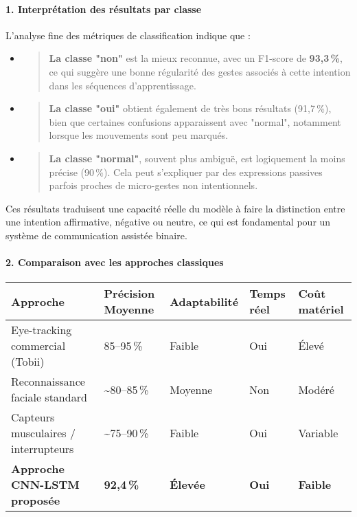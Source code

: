 \documentclass[
]{article}
\begin{document}
\hypertarget{interpruxe9tation-des-ruxe9sultats-par-classe}{%
\paragraph{\texorpdfstring{\textbf{1. Interprétation des résultats par classe}}{1. Interprétation des résultats par classe}}\label{interpruxe9tation-des-ruxe9sultats-par-classe}}

L'analyse fine des métriques de classification indique que :

\begin{itemize}
\item
  \begin{quote}
  \textbf{La classe "non"} est la mieux reconnue, avec un F1-score de \textbf{93,3\,\%}, ce qui suggère une bonne régularité des gestes associés à cette intention dans les séquences d'apprentissage.
  \end{quote}
\item
  \begin{quote}
  \textbf{La classe "oui"} obtient également de très bons résultats (91,7\,\%), bien que certaines confusions apparaissent avec "normal", notamment lorsque les mouvements sont peu marqués.
  \end{quote}
\item
  \begin{quote}
  \textbf{La classe "normal"}, souvent plus ambiguë, est logiquement la moins précise (90\,\%). Cela peut s'expliquer par des expressions passives parfois proches de micro-gestes non intentionnels.
  \end{quote}
\end{itemize}

Ces résultats traduisent une capacité réelle du modèle à faire la distinction entre une intention affirmative, négative ou neutre, ce qui est fondamental pour un système de communication assistée binaire.

\hypertarget{comparaison-avec-les-approches-classiques}{%
\paragraph{\texorpdfstring{\textbf{2. Comparaison avec les approches classiques}}{2. Comparaison avec les approches classiques}}\label{comparaison-avec-les-approches-classiques}}

\begin{longtable}[]{@{}lllll@{}}
\toprule
\textbf{Approche} & \textbf{Précision Moyenne} & \textbf{Adaptabilité} & \textbf{Temps réel} & \textbf{Coût matériel} \\
\midrule
\endhead
Eye-tracking commercial (Tobii) & 85--95\,\% & Faible & Oui & Élevé \\
Reconnaissance faciale standard & \textasciitilde80--85\,\% & Moyenne & Non & Modéré \\
Capteurs musculaires / interrupteurs & \textasciitilde75--90\,\% & Faible & Oui & Variable \\
\textbf{Approche CNN-LSTM proposée} & \textbf{92,4\,\%} & \textbf{Élevée} & \textbf{Oui} & \textbf{Faible} \\
\bottomrule
\end{longtable}
\end{document}
